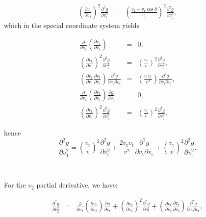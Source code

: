 \documentclass[11pt]{article}
\newcommand{\rt}{\mathrm{t}}
\newcommand{\rr}{\mathrm{r}}
\newcommand{\vr}{v_{\rr}}
\newcommand{\vt}{v_{\rt}}
\begin{document}
\begin{appendices}
\begin{equation}
\begin{array}{ccl}
  \displaystyle{\left(\frac{\partial \vt}{\partial v_{1}}\right)^{2}\frac{\partial^{2}g}{\partial \vt^{2}}}&=& \displaystyle{\left(\frac{v_{1}-\vr\cos\theta}{\vt}\right)^{2}\frac{\partial^{2}g}{\partial \vt^{2}}} ,
\end{array}
\label{eq:d2gdv12_Coeffs_Arbitrary}
\end{equation}
which in the special coordinate system yields

\begin{equation}
\begin{array}{ccl}
  \displaystyle{\frac{\partial}{\partial v_{1}}\left(\frac{\partial \vr}{\partial v_{1}}\right)}&=& \displaystyle{0} ,\\
  \displaystyle{\left(\frac{\partial \vr}{\partial v_{1}}\right)^{2}\frac{\partial^{2}g}{\partial \vr^{2}}}&=& \displaystyle{\left(\frac{\vr}{v}\right)^{2}\frac{\partial^{2}g}{\partial \vr^{2}}} ,\\
  \displaystyle{\left(\frac{\partial \vr}{\partial v_{1}}\frac{\partial \vt}{\partial v_{1}}\right)\frac{\partial^{2}g}{\partial \vt\partial \vr}}&=& \displaystyle{\left(\frac{\vr\vt}{v^{2}}\right)\frac{\partial^{2}g}{\partial \vt\partial \vr}} ,\\
  \displaystyle{\frac{\partial}{\partial v_{1}}\left(\frac{\partial \vt}{\partial v_{1}}\right)\frac{\partial g}{\partial \vt}}&=& \displaystyle{0} ,\\
 
  \displaystyle{\left(\frac{\partial \vt}{\partial v_{1}}\right)^{2}\frac{\partial^{2}g}{\partial \vt^{2}}}&=& \displaystyle{\left(\frac{\vt}{v}\right)^{2}\frac{\partial^{2}g}{\partial \vt^{2}}} ,
\end{array}
\label{eq:d2gdv12_Coeffs_Special}
\end{equation}

hence
\begin{equation}
  \frac{\partial^{2}g}{\partial v_{1}^{2}}  =\left(\frac{\vr}{v}\right)^{2}\frac{\partial^{2}g}{\partial \vr^{2}}+\frac{2\vr\vt}{v^{2}}\frac{\partial^{2}g}{\partial \vt\partial \vr}+\left(\frac{\vt}{v}\right)^{2}\frac{\partial^{2}g}{\partial \vt^{2}}.
  \label{eq:d2gdv12_Special}
\end{equation}

~

For the $v_{2}$ partial derivative, we have:

\begin{equation}
\begin{array}{ccl}
  \displaystyle{\frac{\partial^{2}g}{\partial v_{2}^{2}}}&=& \displaystyle{\frac{\partial}{\partial v_{2}}\left(\frac{\partial \vr}{\partial v_{2}}\right)\frac{\partial g}{\partial \vr}+\left(\frac{\partial \vr}{\partial v_{2}}\right)^{2}\frac{\partial^{2}g}{\partial \vr^{2}}+\left(\frac{\partial \vr}{\partial v_{2}}\frac{\partial \vt}{\partial v_{2}}\right)\frac{\partial^{2}g}{\partial \vt\partial \vr}} ,\\


\end{array}
\end{equation}
\end{appendices}
\end{document}
